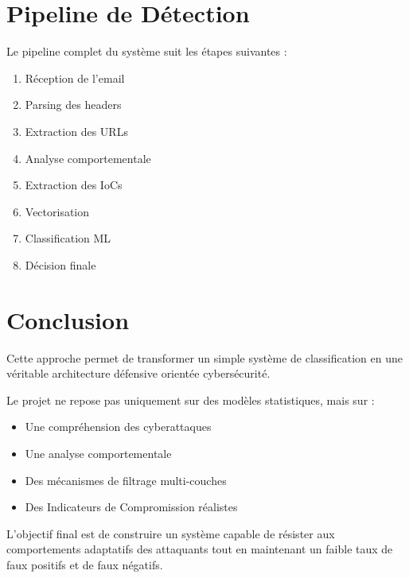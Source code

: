 \documentclass[12pt,a4paper]{article}
\begin{document}
\section{Pipeline de Détection}

Le pipeline complet du système suit les étapes suivantes :

\begin{enumerate}
    \item Réception de l'email
    \item Parsing des headers
    \item Extraction des URLs
    \item Analyse comportementale
    \item Extraction des IoCs
    \item Vectorisation
    \item Classification ML
    \item Décision finale
\end{enumerate}

\section{Conclusion}

Cette approche permet de transformer un simple système de classification en une véritable architecture défensive orientée cybersécurité.

Le projet ne repose pas uniquement sur des modèles statistiques, mais sur :
\begin{itemize}
    \item Une compréhension des cyberattaques
    \item Une analyse comportementale
    \item Des mécanismes de filtrage multi-couches
    \item Des Indicateurs de Compromission réalistes
\end{itemize}

L'objectif final est de construire un système capable de résister aux comportements adaptatifs des attaquants tout en maintenant un faible taux de faux positifs et de faux négatifs.
\end{document}
